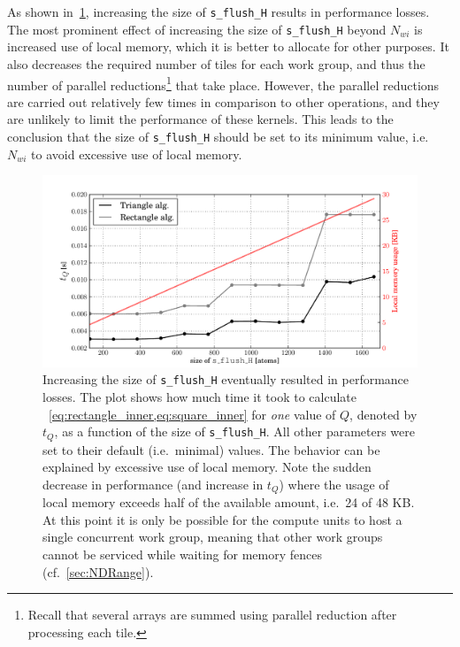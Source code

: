 \documentclass[11pt,twoside]{report}
\begin{document}
\indent As shown in~\cref{fig:s_flush_H}, increasing the size of {\tt s\_flush\_H} results in performance losses. The most prominent effect of increasing the size of {\tt s\_flush\_H}  beyond $N_{wi}$ is increased use of local memory, which it is better to allocate for other purposes. It also decreases the required number of tiles for each work group, and thus the number of parallel reductions\footnote{Recall that several arrays are summed using parallel reduction after processing each tile.} that  take place. However, the parallel reductions are carried out relatively few times in comparison to other operations, and they are unlikely to limit the performance of these kernels. This leads to the conclusion that the size of {\tt s\_flush\_H} should be set to its minimum value, i.e.\ $N_{wi}$  to avoid excessive use of local memory.

\begin{figure}[htbp]
	\begin{center}
		\includegraphics[width=\textwidth]{img/40_sflushH.pdf}	
	\end{center}
	\caption{Increasing the size of {\tt s\_flush\_H} eventually resulted in performance losses. The plot shows how much time  it took to calculate ~\cref{eq:rectangle_inner,eq:square_inner} for {\it one} value of $Q$, denoted by $t_{Q}$,  as a function of the size of {\tt s\_flush\_H}.  All other parameters were set to their default (i.e.\ minimal) values. The behavior can be explained by excessive use of local memory. Note the sudden decrease in performance (and increase in $t_{Q}$) where the usage of local memory  exceeds half of the available amount, i.e.\ 24 of 48 KB. At this point it is only be possible for the compute units to host a single concurrent work group, meaning that other work groups cannot be serviced while waiting for memory fences (cf.~\cref{sec:NDRange}). \label{fig:s_flush_H}}
\end{figure}
\end{document}
